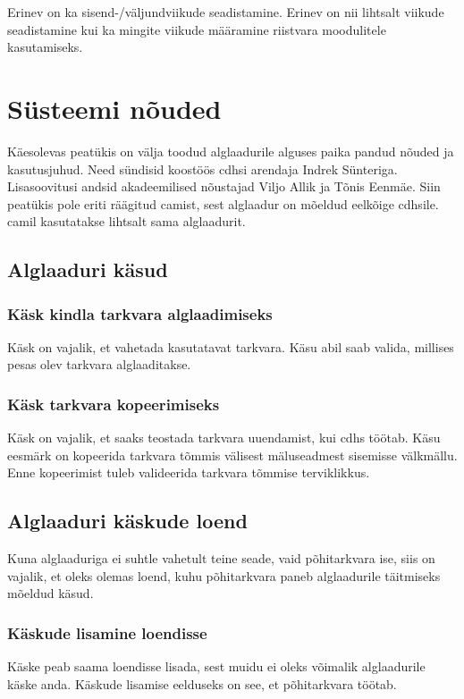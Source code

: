 \documentclass[12pt,a4paper]{article}
\begin{document}
Erinev on ka sisend-/väljundviikude seadistamine. Erinev on nii
lihtsalt viikude seadistamine kui ka mingite viikude määramine riistvara
moodulitele kasutamiseks.

\section{Süsteemi nõuded}
Käesolevas peatükis on välja toodud alglaadurile alguses paika pandud nõu\-ded ja
kasutusjuhud. Need sündisid koostöös \gls{cdhs}i arendaja Indrek Sünter\-iga.
Lisasoovitusi andsid akadeemilised nõustajad Viljo Allik ja Tõnis Eenmäe.
Siin peatükis pole eriti räägitud \gls{cam}ist, sest alglaadur on mõeldud
eelkõige \gls{cdhs}ile. \Gls{cam}il kasutatakse lihtsalt sama alglaadurit.

\subsection{Alglaaduri käsud}
\subsubsection{Käsk kindla tarkvara alglaadimiseks}
Käsk on vajalik, et vahetada kasutatavat tarkvara. Käsu abil saab valida,
millises pesas olev tarkvara alglaaditakse.

\subsubsection{Käsk tarkvara kopeerimiseks}
Käsk on vajalik, et saaks teostada tarkvara uuendamist, kui \gls{cdhs} töötab.
Käsu eesmärk on kopeerida tarkvara tõmmis välisest mäluseadmest sisemisse
välkmällu.  Enne kopeerimist tuleb valideerida tarkvara tõmmise terviklikkus.

\subsection{Alglaaduri käskude loend}
Kuna alglaaduriga ei suhtle vahetult teine seade, vaid põhitarkvara ise, siis on
vajalik, et oleks olemas loend, kuhu põhitarkvara paneb alglaadurile täit\-mi\-seks
mõeldud käsud.
\subsubsection{Käskude lisamine loendisse}
Käske peab saama loendisse lisada, sest muidu ei oleks võimalik alglaadurile
käske anda. Käskude lisamise eelduseks on see, et põhitarkvara töötab.
\end{document}
